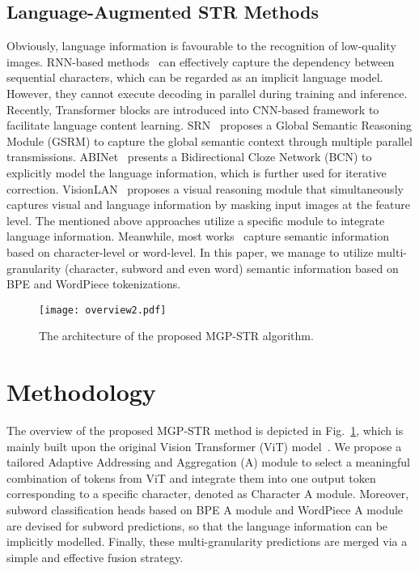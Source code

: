 \documentclass[runningheads]{llncs}
\begin{document}
\subsection{Language-Augmented STR Methods}

Obviously, language information is favourable to the recognition of low-quality images.
RNN-based methods~\cite{CRNN,rnn1,GCRNN}  can effectively capture the dependency between sequential characters, which can be regarded as an implicit language model. 
However, they cannot execute decoding in parallel during training and inference.
Recently, Transformer blocks are introduced into CNN-based framework to facilitate language content learning. 
SRN~\cite{SRN} proposes a Global Semantic Reasoning Module (GSRM) to capture the global semantic context through multiple parallel transmissions.
ABINet~\cite{ABInet} presents a Bidirectional Cloze Network (BCN) to explicitly model the language information, which is further used for iterative correction.
VisionLAN~\cite{vlan} proposes a visual reasoning module that simultaneously captures visual and language information by masking input images at the feature level. 
The mentioned above approaches utilize a specific module to integrate language information.
Meanwhile, most works~\cite{MJ1,ABInet} capture semantic information based on character-level or word-level.
In this paper, we manage to utilize multi-granularity (character, subword and even word) semantic information based on BPE and WordPiece tokenizations.

\begin{figure}[t]\centering
 \texttt{[image: overview2.pdf]}
 \caption{The architecture of the proposed MGP-STR algorithm. }
 \label{fig:overview}
\end{figure}

\section{Methodology}

The overview of the proposed MGP-STR method is depicted in Fig.~\ref{fig:overview}, which is mainly built upon the original Vision Transformer (ViT) model~\cite{dosovitskiy2020image}. We propose a tailored Adaptive Addressing and Aggregation (A) module to select a meaningful combination of tokens from ViT and integrate them into one output token corresponding to a specific character, denoted as Character A module.
Moreover, subword classification heads based on BPE A module and WordPiece A module are devised for subword predictions, so that the language information can be implicitly modelled. 
Finally, these multi-granularity predictions are merged via a simple and effective fusion strategy. 
\end{document}
